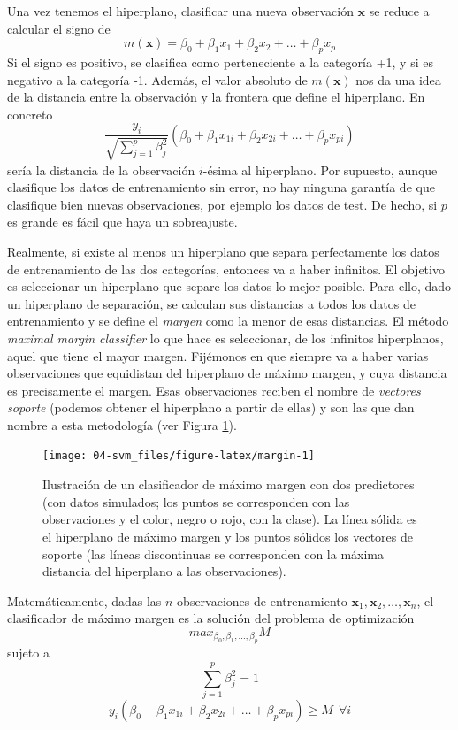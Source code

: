 \documentclass[
]{book}
\theoremstyle{break}
\theoremstyle{nonumberplain}
\begin{document}
Una vez tenemos el hiperplano, clasificar una nueva observación \(\mathbf{x}\) se reduce a calcular el signo de
\[m(\mathbf{x}) = \beta_0 + \beta_1 x_1 + \beta_2 x_2 + \ldots + \beta_p x_p\]
Si el signo es positivo, se clasifica como perteneciente a la categoría +1, y si es negativo a la categoría -1.
Además, el valor absoluto de \(m(\mathbf{x})\) nos da una idea de la distancia entre la observación y la frontera que define el hiperplano.
En concreto
\[\frac{y_i}{\sqrt {\sum_{j=1}^p \beta_j^2}}(\beta_0 + \beta_1 x_{1i} + \beta_2 x_{2i} + \ldots + \beta_p x_{pi})\]
sería la distancia de la observación \(i\)-ésima al hiperplano.
Por supuesto, aunque clasifique los datos de entrenamiento sin error, no hay ninguna garantía de que clasifique bien nuevas observaciones, por ejemplo los datos de test.
De hecho, si \(p\) es grande es fácil que haya un sobreajuste.

Realmente, si existe al menos un hiperplano que separa perfectamente los datos de entrenamiento de las dos categorías, entonces va a haber infinitos.
El objetivo es seleccionar un hiperplano que separe los datos lo mejor posible.
Para ello, dado un hiperplano de separación, se calculan sus distancias a todos los datos de entrenamiento y se define el \emph{margen} como la menor de esas distancias.
El método \emph{maximal margin classifier} lo que hace es seleccionar, de los infinitos hiperplanos, aquel que tiene el mayor margen.
Fijémonos en que siempre va a haber varias observaciones que equidistan del hiperplano de máximo margen, y cuya distancia es precisamente el margen.
Esas observaciones reciben el nombre de \emph{vectores soporte} (podemos obtener el hiperplano a partir de ellas) y son las que dan nombre a esta metodología (ver Figura \ref{fig:margin}).

\begin{figure}[!htb]

{\centering \texttt{[image: 04-svm\_files/figure-latex/margin-1]} 

}

\caption{Ilustración de un clasificador de máximo margen con dos predictores (con datos simulados; los puntos se corresponden con las observaciones y el color, negro o rojo, con la clase). La línea sólida es el hiperplano de máximo margen y los puntos sólidos los vectores de soporte (las líneas discontinuas se corresponden con la máxima distancia del hiperplano a las observaciones).}\label{fig:margin}
\end{figure}

Matemáticamente, dadas las \(n\) observaciones de entrenamiento \(\mathbf{x}_1, \mathbf{x}_2, \ldots, \mathbf{x}_n\), el clasificador de máximo margen es la solución del problema de optimización
\[max_{\beta_0, \beta_1,\ldots, \beta_p} M\]
sujeto a
\[\sum_{j=1}^p \beta_j^2 = 1\]
\[ y_i(\beta_0 + \beta_1 x_{1i} + \beta_2 x_{2i} + \ldots + \beta_p x_{pi}) \ge M \ \ \forall i\]
\end{document}
